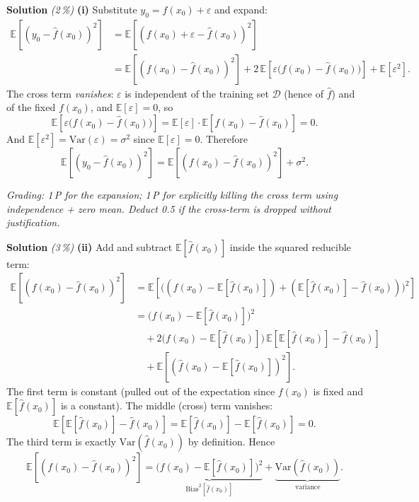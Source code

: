 \documentclass[11pt,a4paper]{article}
\newcommand{\subpoints}[1]{\textit{(#1\,\%)}}
\newcommand{\sol}{\noindent\textbf{Solution}}
\begin{document}
\sol{} \subpoints{2} \textbf{(i)} Substitute $y_0 = f(x_0) + \varepsilon$ and expand:
\begin{align*}
\mathbb{E}\!\left[(y_0-\hat f(x_0))^2\right]
  &= \mathbb{E}\!\left[(f(x_0) + \varepsilon - \hat f(x_0))^2\right] \\
  &= \mathbb{E}\!\left[(f(x_0)-\hat f(x_0))^2\right]
     + 2\,\mathbb{E}\!\left[\varepsilon\bigl(f(x_0)-\hat f(x_0)\bigr)\right]
     + \mathbb{E}[\varepsilon^2].
\end{align*}
The cross term \emph{vanishes}: $\varepsilon$ is independent of the training set $\mathcal{D}$
(hence of $\hat f$) and of the fixed $f(x_0)$, and $\mathbb{E}[\varepsilon]=0$, so
$$\mathbb{E}\!\left[\varepsilon\bigl(f(x_0)-\hat f(x_0)\bigr)\right]
   = \mathbb{E}[\varepsilon]\cdot \mathbb{E}\!\left[f(x_0)-\hat f(x_0)\right] = 0.$$
And $\mathbb{E}[\varepsilon^2] = \mathrm{Var}(\varepsilon) = \sigma^2$ since $\mathbb{E}[\varepsilon]=0$.
Therefore
$$\boxed{\;\mathbb{E}[(y_0-\hat f(x_0))^2] = \mathbb{E}[(f(x_0)-\hat f(x_0))^2] + \sigma^2.\;}$$

\noindent\emph{Grading: 1\,P for the expansion; 1\,P for explicitly killing the cross term using
independence + zero mean. Deduct 0.5 if the cross-term is dropped without justification.}

\medskip
\sol{} \subpoints{3} \textbf{(ii)} Add and subtract $\mathbb{E}[\hat f(x_0)]$ inside the squared
reducible term:
\begin{align*}
\mathbb{E}\!\left[(f(x_0)-\hat f(x_0))^2\right]
&= \mathbb{E}\!\left[\bigl((f(x_0)-\mathbb{E}[\hat f(x_0)]) + (\mathbb{E}[\hat f(x_0)] - \hat f(x_0))\bigr)^2\right] \\
&= \bigl(f(x_0)-\mathbb{E}[\hat f(x_0)]\bigr)^2 \\
&\quad + 2\bigl(f(x_0)-\mathbb{E}[\hat f(x_0)]\bigr)\,\mathbb{E}\!\left[\mathbb{E}[\hat f(x_0)] - \hat f(x_0)\right] \\
&\quad + \mathbb{E}\!\left[(\hat f(x_0) - \mathbb{E}[\hat f(x_0)])^2\right].
\end{align*}
The first term is constant (pulled out of the expectation since $f(x_0)$ is fixed and
$\mathbb{E}[\hat f(x_0)]$ is a constant). The middle (cross) term vanishes:
$$\mathbb{E}\!\left[\mathbb{E}[\hat f(x_0)] - \hat f(x_0)\right] = \mathbb{E}[\hat f(x_0)] - \mathbb{E}[\hat f(x_0)] = 0.$$
The third term is exactly $\mathrm{Var}(\hat f(x_0))$ by definition. Hence
$$\boxed{\;\mathbb{E}\!\left[(f(x_0)-\hat f(x_0))^2\right]
   = \underbrace{\bigl(f(x_0)-\mathbb{E}[\hat f(x_0)]\bigr)^2}_{\mathrm{Bias}^2[\hat f(x_0)]}
   + \underbrace{\mathrm{Var}(\hat f(x_0))}_{\text{variance}}.\;}$$
\end{document}

